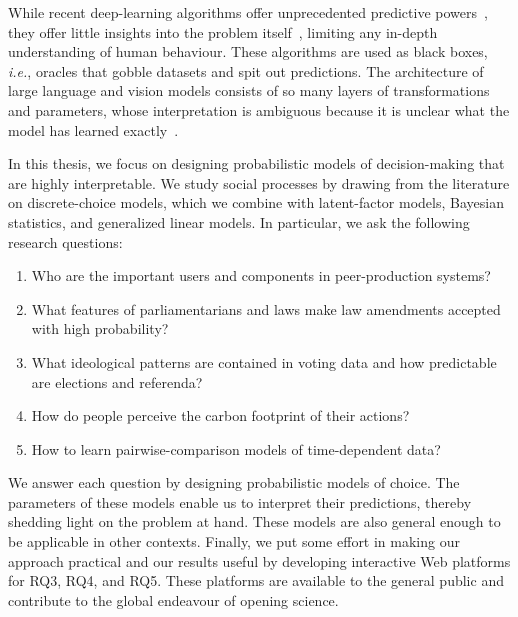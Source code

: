 While recent deep-learning algorithms offer unprecedented predictive powers~\citep{lecun2015deep}, they offer little insights into the problem itself~\citep{rudin2019stop}, limiting any in-depth understanding of human behaviour.
These algorithms are used as black boxes, \textit{i.e.}, oracles that gobble datasets and spit out predictions.
The architecture of large language and vision models consists of so many layers of transformations and parameters, whose interpretation is ambiguous because it is unclear what the model has learned exactly~\citep{fong2017interpretable,guidotti2018survey,olah2020zoom,hilton2020understanding}.

In this thesis, we focus on designing probabilistic models of decision-making that are highly interpretable.
We study social processes by drawing from the literature on discrete-choice models, which we combine with latent-factor models, Bayesian statistics, and generalized linear models.
In particular, we ask the following research questions:
\begin{enumerate}[
		leftmargin=1.5cm,
		topsep=0cm,
		parsep=0.0pt,
		itemsep=1.5pt,
		label=\textbf{RQ\arabic*}
	]
	\item Who are the important users and components in peer-production systems?
	\item What features of parliamentarians and laws make law amendments accepted with high probability?
	\item What ideological patterns are contained in voting data and how predictable are elections and referenda?
	\item How do people perceive the carbon footprint of their actions?
	\item How to learn pairwise-comparison models of time-dependent data?
\end{enumerate}
We answer each question by designing probabilistic models of choice.
The parameters of these models enable us to interpret their predictions, thereby shedding light on the problem at hand.
These models are also general enough to be applicable in other contexts.
Finally, we put some effort in making our approach practical and our results useful by developing interactive Web platforms for RQ3, RQ4, and RQ5.
These platforms are available to the general public and contribute to the global endeavour of opening science.
